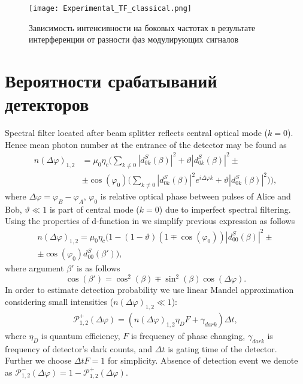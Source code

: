  \begin{figure}[ht]
  \centering
  \texttt{[image: Experimental\_TF\_classical.png]}
  \caption{Зависимость интенсивности на боковых частотах в результате интерференции от разности фаз модулирующих сигналов}
  \label{fig:Experimental_TF_classical}
\end{figure}

\pagebreak





\section{Вероятности срабатываний детекторов} \label{ch:ch5/sect5}

 Spectral filter located after beam splitter reflects central optical mode ($k=0$). Hence mean photon number at the entrance of the detector may be found as
\begin{align}\label{nph1}
    n(\Delta\varphi)_{1,2}&=\mu_0\eta_c\Bigg(\sum_{k\neq 0}|d_{0k}^{S}(\beta)|^2 + \vartheta|d_{0k}^{S}(\beta)|^2 \pm \nonumber \\
    &\pm \cos(\varphi_0)\Big(\sum_{k\neq 0}|d_{0k}^{S}(\beta)|^2e^{i\Delta\varphi k}+ \vartheta|d_{0k}^{S}(\beta)|^2 \Big) \Bigg),
\end{align}
where $\Delta\varphi=\varphi_B-\varphi_A$, $\varphi_0$ is relative optical phase between pulses of Alice and Bob, $\vartheta \ll 1$ is part of central mode ($k=0$) due to imperfect spectral filtering. Using the properties of d-function in \cite{varshalovich1988quantum} we simplify previous expression as follows
\begin{align}
    n(\Delta\varphi)_{1,2}=\mu_0\eta_c\Big(1-(1-\vartheta)(1\mp\cos(\varphi_0))|d_{00}^{S}(\beta)|^2 \pm \nonumber \\
    \pm\cos(\varphi_0)d_{00}^{S}(\beta')\Big) \label{nph},
\end{align}
where argument $\beta'$ is as follows
\begin{equation} \label{betaappox}
    \cos(\beta')=\cos^2(\beta) \mp \sin^2(\beta)\cos(\Delta\varphi).
\end{equation}
In order to estimate detection probability we use linear Mandel approximation considering small intensities ($n(\Delta\varphi)_{1,2} \ll 1$):
\begin{eqnarray}
    \mathcal{P}_{1,2}^{+}(\Delta\varphi)=\left(n(\Delta\varphi)_{1,2}\eta_DF+\gamma_{dark}\right)\Delta t, \label{pdet}
\end{eqnarray}
where $\eta_D$ is quantum efficiency, $F$ is frequency of phase changing, $\gamma_{dark}$ is frequency of detector's dark counts, and $\Delta t$ is gating time of the detector. Further we choose $\Delta t F=1$ for simplicity. Absence of detection event we denote as $\mathcal{P}_{1,2}^{-}(\Delta\varphi)=1-\mathcal{P}_{1,2}^{+}(\Delta\varphi)$.     



